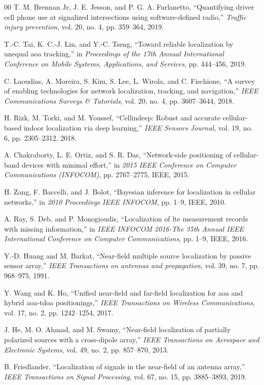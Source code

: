 \documentclass[journal, onecolumn]{IEEEtran}
\begin{document}
\begin{thebibliography}{00}
 T. M. Brennan Jr, J. E. Jesson, and P. G. A. Furlanetto, “Quantifying driver cell phone use at signalized intersections using software-defined radio,” \emph{Traffic injury prevention}, vol. 20, no. 4, pp. 359–364, 2019.

 T.-C. Tai, K. C.-J. Lin, and Y.-C. Tseng, “Toward reliable localization by unequal aoa tracking,” in \emph{Proceedings of the 17th Annual International Conference on Mobile Systems, Applications, and Services}, pp. 444–456, 2019.

 C. Laoudias, A. Moreira, S. Kim, S. Lee, L. Wirola, and C. Fischione, “A survey of enabling technologies for network localization, tracking, and navigation,” \emph{IEEE Communications Surveys \& Tutorials}, vol. 20, no. 4, pp. 3607–3644, 2018.

 H. Rizk, M. Torki, and M. Youssef, “Cellindeep: Robust and accurate cellular-based indoor localization via deep learning,” \emph{IEEE Sensors Journal}, vol. 19, no. 6, pp. 2305–2312, 2018.

 A. Chakraborty, L. E. Ortiz, and S. R. Das, “Network-side positioning of cellular-band devices with minimal effort,” in \emph{2015 IEEE Conference on Computer Communications (INFOCOM)}, pp. 2767–2775, IEEE, 2015.

 H. Zang, F. Baccelli, and J. Bolot, “Bayesian inference for localization in cellular networks,” in \emph{2010 Proceedings IEEE INFOCOM}, pp. 1–9, IEEE, 2010.

 A. Ray, S. Deb, and P. Monogioudis, “Localization of lte measurement records with missing information,” in \emph{IEEE INFOCOM 2016-The 35th Annual IEEE International Conference on Computer Communications}, pp. 1–9, IEEE, 2016.

 Y.-D. Huang and M. Barkat, “Near-field multiple source localization by passive sensor array,” \emph{IEEE Transactions on antennas and propagation}, vol. 39, no. 7, pp. 968–975, 1991.

 Y. Wang and K. Ho, “Unified near-field and far-field localization for aoa and hybrid aoa-tdoa positionings,” \emph{IEEE Transactions on Wireless Communications}, vol. 17, no. 2, pp. 1242–1254, 2017.

 J. He, M. O. Ahmad, and M. Swamy, “Near-field localization of partially polarized sources with a cross-dipole array,” \emph{IEEE Transactions on Aerospace and Electronic Systems}, vol. 49, no. 2, pp. 857–870, 2013.

 B. Friedlander, “Localization of signals in the near-field of an antenna array,” \emph{IEEE Transactions on Signal Processing}, vol. 67, no. 15, pp. 3885–3893, 2019.

\end{thebibliography}
\end{document}
